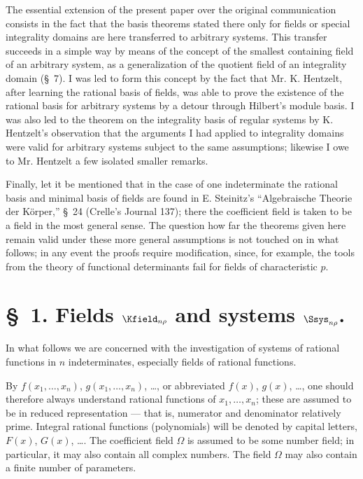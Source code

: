 \documentclass[11pt]{article}
\begin{document}
The essential extension of the present paper over the original communication consists in the fact that the basis theorems stated there only for fields or special integrality domains are here transferred to arbitrary systems. This transfer succeeds in a simple way by means of the concept of the smallest containing field of an arbitrary system, as a generalization of the quotient field of an integrality domain (\S\ 7). I was led to form this concept by the fact that Mr. K. Hentzelt, after learning the rational basis of fields, was able to prove the existence of the rational basis for arbitrary systems by a detour through Hilbert's module basis. I was also led to the theorem on the integrality basis of regular systems by K. Hentzelt's observation that the arguments I had applied to integrality domains were valid for arbitrary systems subject to the same assumptions; likewise I owe to Mr. Hentzelt a few isolated smaller remarks.

Finally, let it be mentioned that in the case of one indeterminate the rational basis and minimal basis of fields are found in E. Steinitz's ``Algebraische Theorie der Körper,'' \S\ 24 (Crelle's Journal 137); there the coefficient field is taken to be a field in the most general sense. The question how far the theorems given here remain valid under these more general assumptions is not touched on in what follows; in any event the proofs require modification, since, for example, the tools from the theory of functional determinants fail for fields of characteristic $p$.

\section*{\S\ 1. Fields $\Kfield_{n\rho}$ and systems $\Ssys_{n\rho}$.}

In what follows we are concerned with the investigation of systems of rational functions in $n$ indeterminates, especially fields of rational functions.

By $f(x_1,\ldots,x_n)$, $g(x_1,\ldots,x_n)$, \ldots, or abbreviated $f(x)$, $g(x)$, \ldots, one should therefore always understand rational functions of $x_1,
\ldots,x_n$; these are assumed to be in reduced representation --- that is, numerator and denominator relatively prime. Integral rational functions (polynomials) will be denoted by capital letters, $F(x)$, $G(x)$, \ldots. The coefficient field $\Omega$ is assumed to be some number field; in particular, it may also contain all complex numbers. The field $\Omega$ may also contain a finite number of parameters.
\end{document}
